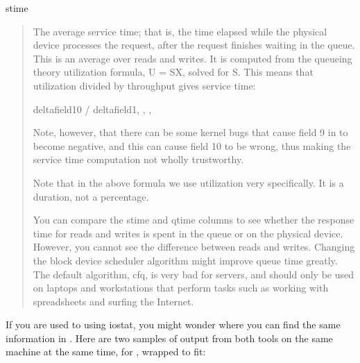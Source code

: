 \documentclass[letterpaper,10pt,english]{sphinxmanual}
\begin{document}
\sphinxAtStartPar
stime
\begin{quote}

\sphinxAtStartPar
The average service time; that is, the time elapsed while the physical device
processes the request, after the request finishes waiting in the queue.  This is
an average over reads and writes.  It is computed from the queueing theory
utilization formula, U = SX, solved for S.  This means that utilization divided
by throughput gives service time:

\begin{sphinxVerbatim}[commandchars=\\\{\}]
delta\PYG{o}{[}field10\PYG{o}{]} / delta\PYG{o}{[}field1, , , \PYG{o}{]}
\end{sphinxVerbatim}

\sphinxAtStartPar
Note, however, that there can be some kernel bugs that cause field 9 in
 to become negative, and this can cause field 10 to be wrong,
thus making the service time computation not wholly trustworthy.

\sphinxAtStartPar
Note that in the above formula we use utilization very specifically. It is a
duration, not a percentage.

\sphinxAtStartPar
You can compare the stime and qtime columns to see whether the response time for
reads and writes is spent in the queue or on the physical device.  However, you
cannot see the difference between reads and writes.  Changing the block device
scheduler algorithm might improve queue time greatly.  The default algorithm,
cfq, is very bad for servers, and should only be used on laptops and
workstations that perform tasks such as working with spreadsheets and surfing
the Internet.
\end{quote}

\sphinxAtStartPar
If you are used to using iostat, you might wonder where you can find the same
information in .  Here are two samples of output from both tools on
the same machine at the same time, for , wrapped to fit:
\end{document}

